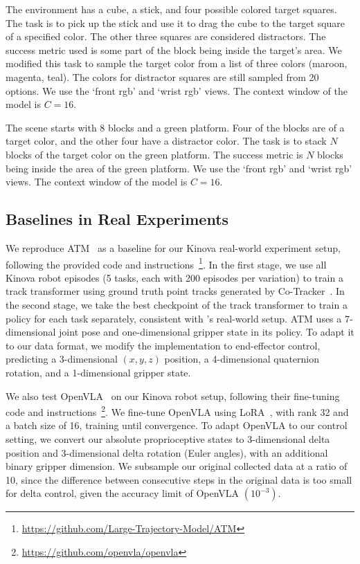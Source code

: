  The environment has a cube, a stick, and four possible colored target squares. The task is to pick up the stick and use it to drag the cube to the target square of a specified color. The other three squares are considered distractors. The success metric used is some part of the block being inside the target's area. We modified this task to sample the target color from a list of three colors (maroon, magenta, teal). The colors for distractor squares are still sampled from 20 options. We use the `front rgb' and `wrist rgb' views. The context window  of the model is $C = 16$.

 The scene starts with 8 blocks and a green platform. Four of the blocks are of a target color, and the other four have a distractor color. The task is to stack $N$ blocks of the target color on the green platform. The success metric is $N$ blocks being inside the area of the green platform. We use the `front rgb' and `wrist rgb' views. The context window  of the model is $C = 16$.

\subsection{Baselines in Real Experiments} \label{supp:reproduce_atm_openvla}

 We reproduce ATM~\cite{wenAnypointTrajectoryModeling2024} as a baseline for our Kinova real-world experiment setup, following the provided code and instructions~\footnote{\href{https://github.com/Large-Trajectory-Model/ATM}{https://github.com/Large-Trajectory-Model/ATM}}. In the first stage, we use all Kinova robot episodes (5 tasks, each with 200 episodes per variation) to train a track transformer using ground truth point tracks generated by Co-Tracker~\cite{karaev2025cotracker}. In the second stage, we take the best checkpoint of the track transformer to train a policy for each task separately, consistent with \smodel{}'s real-world setup. ATM uses a 7-dimensional joint pose and one-dimensional gripper state in its policy. To adapt it to our data format, we modify the implementation to end-effector control, predicting a 3-dimensional $(x, y, z)$ position, a 4-dimensional quaternion rotation, and a 1-dimensional gripper state.


 We also test OpenVLA~\cite{kimOpenVLAOpenSourceVisionLanguageAction2024} on our Kinova robot setup, following their fine-tuning code and instructions~\footnote{\href{https://github.com/openvla/openvla}{https://github.com/openvla/openvla}}. We fine-tune OpenVLA using LoRA~\cite{lora}, with rank 32 and a batch size of 16, training until convergence. To adapt OpenVLA to our control setting, we convert our absolute proprioceptive states to 3-dimensional delta position and 3-dimensional delta rotation (Euler angles), with an additional binary gripper dimension. We subsample our original collected data at a ratio of 10, since the difference between consecutive steps in the original data is too small for delta control, given the accuracy limit of OpenVLA $(10^{-3})$.

